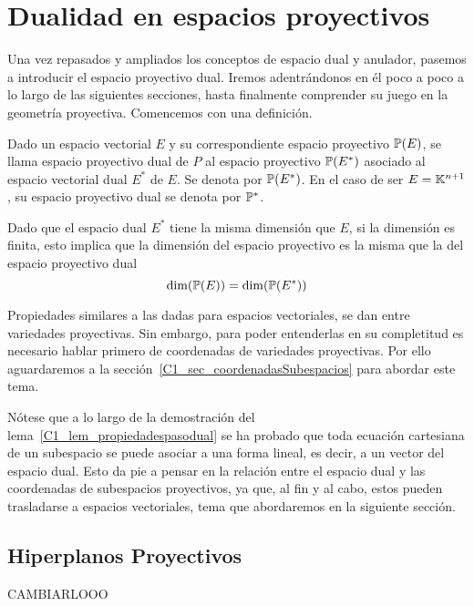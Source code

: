 \section{Dualidad en espacios proyectivos}
Una vez repasados y ampliados los conceptos de espacio dual y anulador, pasemos a introducir el espacio proyectivo dual. Iremos adentrándonos en él poco a poco a lo largo de las siguientes secciones, hasta finalmente comprender su juego en la geometría proyectiva. Comencemos con una definición.
\begin{defi}
	Dado un espacio vectorial $E$ y su correspondiente espacio proyectivo $\mathbb{P}(E)$, se llama espacio proyectivo dual de $P$ al espacio proyectivo $\mathbb{P}(E^*)$ asociado al espacio vectorial dual $E^*$ de $E$. Se denota por $\mathbb{P}(E^*)$. En el caso de ser $E=\mathbb{K}^{n+1}$, su espacio proyectivo dual se denota por $\mathbb{P}^*$.
\end{defi}
\begin{obs}
	Dado que el espacio dual $E^*$ tiene la misma dimensión que $E$, si la dimensión es finita, esto implica que la dimensión del espacio proyectivo es la misma que la del espacio proyectivo dual
	\begin{equation*}
	\dim(\mathbb{P}(E))=\dim (\mathbb{P}(E^*))
	\end{equation*}
\end{obs}
Propiedades similares a las dadas para espacios vectoriales, se dan entre variedades proyectivas. Sin embargo, para poder entenderlas en su completitud es necesario hablar primero de coordenadas de variedades proyectivas. Por ello aguardaremos a la sección~\ref{C1_sec_coordenadasSubespacios} para abordar este tema.

Nótese que a lo largo de la demostración del lema~\ref{C1_lem_propiedadespasodual} se ha probado que toda ecuación cartesiana de un subespacio se puede asociar a una forma lineal, es decir, a un vector del espacio dual. Esto da pie a pensar en la relación entre el espacio dual y las coordenadas de subespacios proyectivos, ya que, al fin y al cabo, estos pueden trasladarse a espacios vectoriales, tema que abordaremos en la siguiente sección.

\subsection{Hiperplanos Proyectivos}
CAMBIARLOOO

